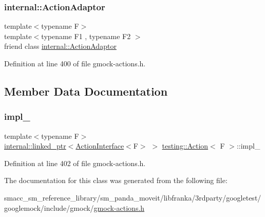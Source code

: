 \subsubsection{\texorpdfstring{internal\+::\+Action\+Adaptor}{internal::ActionAdaptor}}
{\footnotesize\ttfamily template$<$typename F$>$ \\
template$<$typename F1 , typename F2 $>$ \\
friend class \hyperlink{classtesting_1_1internal_1_1ActionAdaptor}{internal\+::\+Action\+Adaptor}\hspace{0.3cm}{\ttfamily [friend]}}



Definition at line 400 of file gmock-\/actions.\+h.



\subsection{Member Data Documentation}
\mbox{\label{classtesting_1_1Action_a878cb86f5126a22b5c6d5d8fb919f5d9}} 
\subsubsection{\texorpdfstring{impl\+\_\+}{impl\_}}
{\footnotesize\ttfamily template$<$typename F$>$ \\
\hyperlink{classtesting_1_1internal_1_1linked__ptr}{internal\+::linked\+\_\+ptr}$<$\hyperlink{classtesting_1_1ActionInterface}{Action\+Interface}$<$F$>$ $>$ \hyperlink{classtesting_1_1Action}{testing\+::\+Action}$<$ F $>$\+::impl\+\_\+\hspace{0.3cm}{\ttfamily [private]}}



Definition at line 402 of file gmock-\/actions.\+h.



The documentation for this class was generated from the following file\+:\begin{DoxyCompactItemize}
\item 
smacc\+\_\+sm\+\_\+reference\+\_\+library/sm\+\_\+panda\+\_\+moveit/libfranka/3rdparty/googletest/googlemock/include/gmock/\hyperlink{gmock-actions_8h}{gmock-\/actions.\+h}\end{DoxyCompactItemize}
